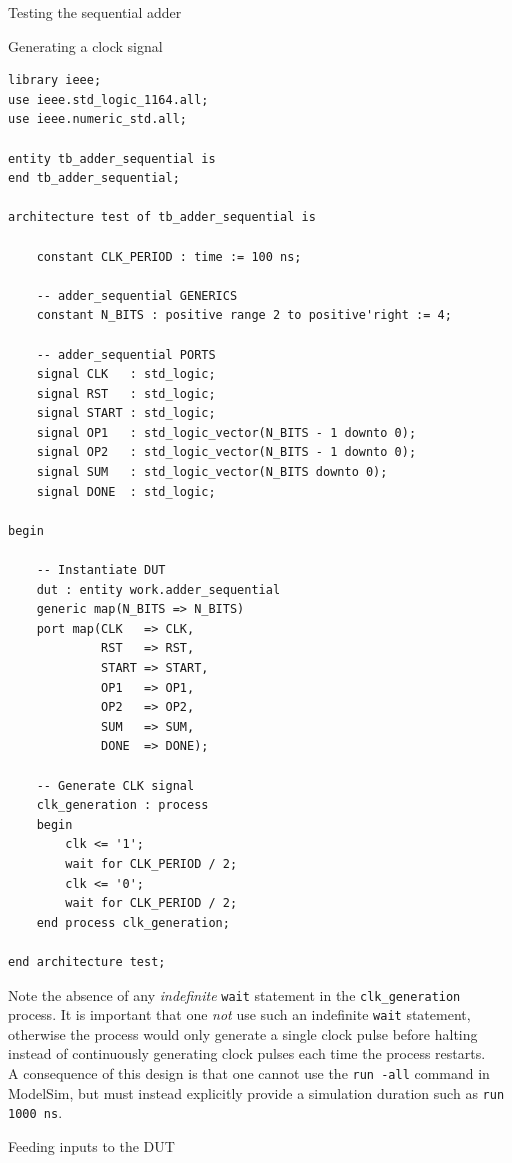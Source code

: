 \documentclass[lab]{course}
\begin{document}
\begin{section}{Testing the sequential adder}
\begin{subsection}{Generating a clock signal}
        \begin{lstlisting}[caption={Add process for generating \texttt{CLK} signal}, captionpos=b, label={lst:sequential_process_generate_clk}]
library ieee;
use ieee.std_logic_1164.all;
use ieee.numeric_std.all;

entity tb_adder_sequential is
end tb_adder_sequential;

architecture test of tb_adder_sequential is

    constant CLK_PERIOD : time := 100 ns;

    -- adder_sequential GENERICS
    constant N_BITS : positive range 2 to positive'right := 4;

    -- adder_sequential PORTS
    signal CLK   : std_logic;
    signal RST   : std_logic;
    signal START : std_logic;
    signal OP1   : std_logic_vector(N_BITS - 1 downto 0);
    signal OP2   : std_logic_vector(N_BITS - 1 downto 0);
    signal SUM   : std_logic_vector(N_BITS downto 0);
    signal DONE  : std_logic;

begin

    -- Instantiate DUT
    dut : entity work.adder_sequential
    generic map(N_BITS => N_BITS)
    port map(CLK   => CLK,
             RST   => RST,
             START => START,
             OP1   => OP1,
             OP2   => OP2,
             SUM   => SUM,
             DONE  => DONE);

    -- Generate CLK signal
    clk_generation : process
    begin
        clk <= '1';
        wait for CLK_PERIOD / 2;
        clk <= '0';
        wait for CLK_PERIOD / 2;
    end process clk_generation;

end architecture test;
        \end{lstlisting}

        Note the absence of any \emph{indefinite} \verb+wait+ statement in the \verb+clk_generation+ process. It is important that one \emph{not} use such an indefinite \verb+wait+ statement, otherwise the process would only generate a single clock pulse before halting instead of continuously generating clock pulses each time the process restarts. \\

        A consequence of this design is that one cannot use the \verb+run -all+ command in ModelSim, but must instead explicitly provide a simulation duration such as \verb+run 1000 ns+.
    \end{subsection}

    \begin{subsection}{Feeding inputs to the DUT}


\end{subsection}
\end{section}
\end{document}
